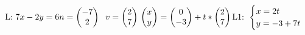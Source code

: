 \subsection{}
\begin{math}
    \text{L: }
    7x-2y=6
    \\
    n=\begin{pmatrix}
        -7\\
        2
    \end{pmatrix}
    \hspace{6px}
    v=\begin{pmatrix}
        2\\
        7
    \end{pmatrix}
    \\
    \begin{pmatrix}
        x\\
        y
    \end{pmatrix}
    =\begin{pmatrix}
        0\\
        -3
    \end{pmatrix}
    +t*
    \begin{pmatrix}
        2\\
        7
    \end{pmatrix}
    \\
    \text{L1: }
    \begin{cases}
        x=2t\\
        y=-3+7t
    \end{cases}
\end{math}